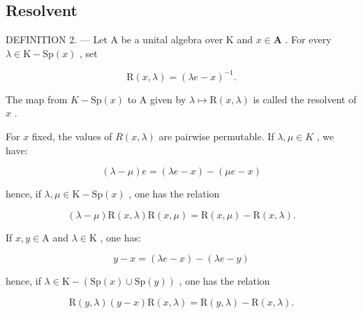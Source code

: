 \subsection{Resolvent}

DEFINITION 2. --- Let A be a unital algebra over K and \(x \in \mathbf{A}\) . For every \(\lambda \in \mathrm{K} - \mathrm{Sp}(x)\) , set

\[
\mathrm{R} (x, \lambda) = (\lambda e - x) ^ {- 1}.
\]

The map from \(K-\mathrm{Sp}(x)\) to A given by \(\lambda\mapsto\mathrm{R}(x,\lambda)\) is called the resolvent of \(x\) .

For \(x\) fixed, the values of \(R(x, \lambda)\) are pairwise permutable. If \(\lambda, \mu \in K\) , we have:

\[
(\lambda - \mu) e = (\lambda e - x) - (\mu e - x)
\]

hence, if \(\lambda, \mu \in \mathrm{K} - \mathrm{Sp}(x)\) , one has the relation

\[
(\lambda - \mu) \mathrm{R} (x, \lambda) \mathrm{R} (x, \mu) = \mathrm{R} (x, \mu) - \mathrm{R} (x, \lambda).\tag{1}
\]

If \(x,y\in \mathrm{A}\) and \(\lambda \in \mathrm{K}\) , one has:

\[
y - x = (\lambda e - x) - (\lambda e - y)
\]

hence, if \(\lambda\in\mathrm{K}-(\mathrm{Sp}(x)\cup\mathrm{Sp}(y))\) , one has the relation

\[
\mathrm{R} (y, \lambda) (y - x) \mathrm{R} (x, \lambda) = \mathrm{R} (y, \lambda) - \mathrm{R} (x, \lambda).\tag{2}
\]

